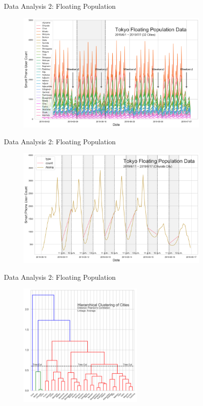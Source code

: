 \documentclass[aspectratio=169]{beamer}
\begin{document}
\begin{frame}{Data Analysis 2: Floating Population}
    \begin{figure}
        \centering
        \includegraphics[height=0.85\textheight,width=0.85\textwidth]{images/Tokyo Float Pop 32.png}
    \end{figure}
\end{frame}

\begin{frame}{Data Analysis 2: Floating Population}
    \begin{figure}
        \centering
        \includegraphics[height=0.85\textheight,width=0.85\textwidth]{images/Interpolate Akima.png}
    \end{figure}
\end{frame}

\begin{frame}{Data Analysis 2: Floating Population}
    \begin{figure}
        \centering
        \includegraphics[height=0.85\textheight,width=0.55\textwidth]{images/Dendrogram.png}
    \end{figure}
\end{frame}
\end{document}
